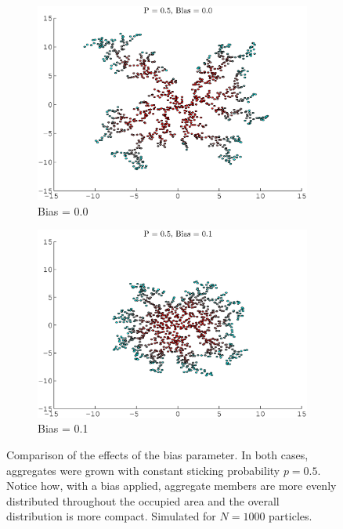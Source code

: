 \documentclass{article}
\begin{document}
\begin{appendix}
\begin{figure}[ht!]
\centering
\begin{subfigure}{.5\textwidth}
  \centering
  \includegraphics[width=.95\linewidth]{bias_0005.eps}
  \caption[width = .95\linewidth]{Bias = 0.0}
  \label{bias1}
\end{subfigure}%
\begin{subfigure}{.5\textwidth}
  \centering
  \includegraphics[width=.95\linewidth]{bias_0105.eps}
	\caption[width = .95\linewidth]{Bias = 0.1}
  \label{bias2}
\end{subfigure}
\caption{Comparison of the effects of the bias parameter. In both cases, aggregates were grown with constant sticking probability $p = 0.5$. Notice how, with a bias applied, aggregate members are more evenly distributed throughout the occupied area and the overall distribution is more compact. Simulated for $N = 1000$ particles.}
\label{fig:bias}
\end{figure}


\end{appendix}
\end{document}
